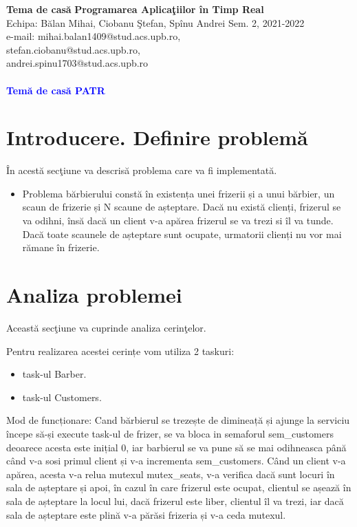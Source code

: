 \documentclass[a4paper, 11pt]{article}
\begin{document}

\noindent
\large\textbf{Tema de cas\u{a}} \hfill \textbf{Programarea Aplica\c{t}iilor \^{i}n Timp Real} \\
\normalsize Echipa: B\u{a}lan Mihai, Ciobanu \c{S}tefan, Sp\^{i}nu Andrei  \hfill Sem. 2, 2021-2022 \\ 
\normalsize e-mail: mihai.balan1409@stud.acs.upb.ro,\\ stefan.ciobanu@stud.acs.upb.ro,\\ andrei.spinu1703@stud.acs.upb.ro  \\
\\
\large\textbf{\textcolor{blue}{Tem\u{a} de cas\u{a} PATR}}


\section{Introducere. Definire problem\u{a}}

\^{I}n acest\u{a} sec\c{t}iune va descris\u{a} problema care va fi implementat\u{a}.

\begin{itemize}
\item Problema bărbierului constă în existența unei frizerii și a unui bărbier, un scaun de frizerie și N scaune  de așteptare.
Dacă nu există clienți, frizerul se va odihni, însă dacă un client v-a apărea frizerul se va trezi si îl va tunde. Dacă toate scaunele de așteptare sunt ocupate, urmatorii clienți nu vor mai rămane în frizerie.
\end{itemize}

\section{Analiza problemei}

Aceast\u{a} sec\c{t}iune va cuprinde analiza cerin\c{t}elor.

Pentru realizarea acestei cerințe vom utiliza 2 taskuri:

\begin{itemize}
\item task-ul Barber.
\item task-ul Customers.
\end{itemize}


Mod de funcționare:
Cand bărbierul se trezește de dimineață și ajunge la serviciu începe să-și execute task-ul de frizer, se va bloca in semaforul sem\_customers deoarece acesta este inițial 0, iar barbierul se va pune să se mai odihneasca până când v-a sosi primul client și v-a incrementa sem\_customers.
Când un client v-a apărea, acesta v-a relua mutexul mutex\_seats, v-a verifica dacă sunt locuri în sala de așteptare și apoi, în cazul în care frizerul este ocupat, clientul se așează în sala de așteptare la locul lui, dacă frizerul este liber, clientul îl va trezi, iar dacă sala de așteptare este plină v-a părăsi frizeria și v-a ceda mutexul.
\end{document}
